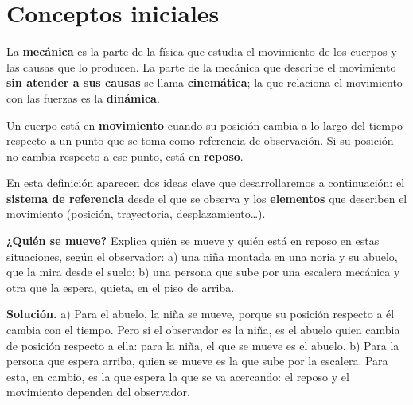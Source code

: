 \section{Conceptos iniciales}\label{sec:ud8-conceptos}

La \textbf{mecánica} es la parte de la física que estudia el movimiento de los cuerpos y las causas que lo producen. La parte de la
mecánica que describe el movimiento \textbf{sin atender a sus causas} se llama \textbf{cinemática}; la que relaciona el movimiento
con las fuerzas es la \textbf{dinámica}.

\begin{definition}[Movimiento]
    Un cuerpo está en \textbf{movimiento} cuando su posición cambia a lo largo del tiempo respecto a un punto que se toma como
    referencia de observación. Si su posición no cambia respecto a ese punto, está en \textbf{reposo}.
\end{definition}

En esta definición aparecen dos ideas clave que desarrollaremos a continuación: el \textbf{sistema de referencia} desde el que se
observa y los \textbf{elementos} que describen el movimiento (posición, trayectoria, desplazamiento\ldots).

\begin{example}
    \textbf{¿Quién se mueve?} Explica quién se mueve y quién está en reposo en estas situaciones, según el observador:
    a) una niña montada en una noria y su abuelo, que la mira desde el suelo; b) una persona que sube por una escalera mecánica y
    otra que la espera, quieta, en el piso de arriba.

    \textbf{Solución.} a) Para el abuelo, la niña se mueve, porque su posición respecto a él cambia con el tiempo. Pero si el
    observador es la niña, es el abuelo quien cambia de posición respecto a ella: para la niña, el que se mueve es el abuelo.
    b) Para la persona que espera arriba, quien se mueve es la que sube por la escalera. Para esta, en cambio, es la que espera
    la que se va acercando: el reposo y el movimiento dependen del observador.
\end{example}

